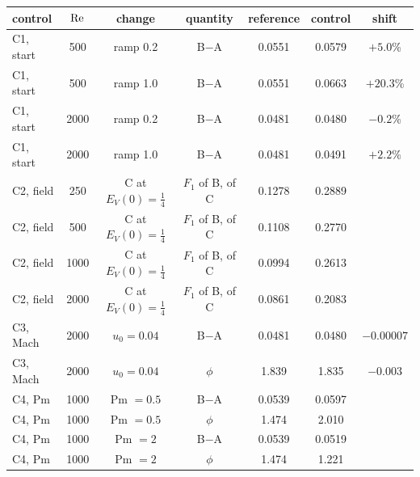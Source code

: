 \begin{tabular}{lcccccc}
control & $\mathrm{Re}$ & change & quantity & reference & control & shift \\
\hline
C1, start & 500 & ramp 0.2 & B$-$A & 0.0551 & 0.0579 & $+5.0$\% \\
C1, start & 500 & ramp 1.0 & B$-$A & 0.0551 & 0.0663 & $+20.3$\% \\
C1, start & 2000 & ramp 0.2 & B$-$A & 0.0481 & 0.0480 & $-0.2$\% \\
C1, start & 2000 & ramp 1.0 & B$-$A & 0.0481 & 0.0491 & $+2.2$\% \\
C2, field & 250 & C at $E_V(0)=\frac14$ & $F_1$ of B, of C & 0.1278 & 0.2889 & \\
C2, field & 500 & C at $E_V(0)=\frac14$ & $F_1$ of B, of C & 0.1108 & 0.2770 & \\
C2, field & 1000 & C at $E_V(0)=\frac14$ & $F_1$ of B, of C & 0.0994 & 0.2613 & \\
C2, field & 2000 & C at $E_V(0)=\frac14$ & $F_1$ of B, of C & 0.0861 & 0.2083 & \\
C3, Mach & 2000 & $u_0=0.04$ & B$-$A & 0.0481 & 0.0480 & $-0.00007$ \\
C3, Mach & 2000 & $u_0=0.04$ & $\phi$ & 1.839 & 1.835 & $-0.003$ \\
C4, Pm & 1000 & Pm $=0.5$ & B$-$A & 0.0539 & 0.0597 & \\
C4, Pm & 1000 & Pm $=0.5$ & $\phi$ & 1.474 & 2.010 & \\
C4, Pm & 1000 & Pm $=2$ & B$-$A & 0.0539 & 0.0519 & \\
C4, Pm & 1000 & Pm $=2$ & $\phi$ & 1.474 & 1.221 & \\
\end{tabular}
